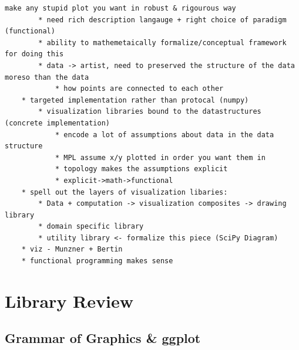 \documentclass[letterpaper,onecolumn,titlepage]{Ythesis}
\begin{document}
\begin{verbatim}
make any stupid plot you want in robust & rigourous way
        * need rich description langauge + right choice of paradigm (functional) 
        * ability to mathemetaically formalize/conceptual framework for doing this
        * data -> artist, need to preserved the structure of the data moreso than the data 
            * how points are connected to each other
    * targeted implementation rather than protocal (numpy)
        * visualization libraries bound to the datastructures (concrete implementation)
            * encode a lot of assumptions about data in the data structure
            * MPL assume x/y plotted in order you want them in 
            * topology makes the assumptions explicit
            * explicit->math->functional  
    * spell out the layers of visualization libaries:
        * Data + computation -> visualization composites -> drawing library
        * domain specific library
        * utility library <- formalize this piece (SciPy Diagram)
    * viz - Munzner + Bertin
    * functional programming makes sense 
\end{verbatim}


\section{Library Review}
\subsection{Grammar of Graphics \& ggplot}
\cite{wilkinsonGrammarGraphicsStatistics2005}
\cite{wickhamGgplot2ElegantGraphics2016}


\printbibliography
\end{document}
